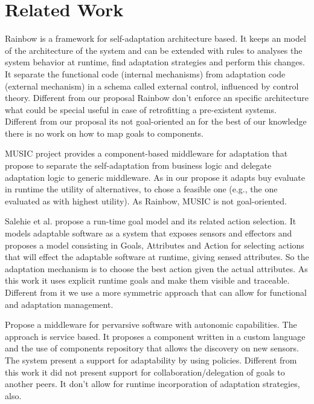 \section{Related Work}
\label{related}


Rainbow is a framework for self-adaptation architecture based\cite{garlan_rainbow:_2004}. It keeps an model of the architecture of the system and can be extended with rules to analyses the system behavior at runtime, find adaptation strategies and perform this changes. It separate the functional  code (internal mechanisms) from adaptation code (external mechanism) in a schema called external control, influenced by control theory. \cite{garlan_software_2009}
Different from our proposal Rainbow don't enforce an specific architecture what could be special useful in case of retrofitting a pre-existent systems. Different from our proposal its not goal-oriented an for the best of our knowledge there is no work on how to map goals to  components.

MUSIC project provides a component-based middleware for adaptation that propose to separate the self-adaptation from business logic and delegate adaptation logic to generic middleware. As in our propose it adapts buy evaluate in runtime the utility of alternatives, to chose a feasible one (e.g., the one evaluated as with highest utility)\cite{rouvoy_music:_2009}. As Rainbow, MUSIC is not goal-oriented.

Salehie et al. \cite{salehie_towards_2012} propose a run-time goal model and its related
action selection. It models adaptable software as a system that exposes sensors and effectors and  proposes a model consisting in Goals, Attributes and Action for selecting actions that will effect the adaptable software at runtime, giving sensed attributes.
So the adaptation mechanism is to choose the best action given the actual attributes.
As this work it uses explicit runtime goals and make them visible and traceable.
Different from it we use a more symmetric approach that can allow for functional
and adaptation management.

\cite{gunalp_autonomic_2012} Propose a middleware for pervarsive software with autonomic capabilities. The approach is service based. It proposes a component written in a custom language and the use of components repository that allows the discovery on new sensors. The system present a support for adaptability by using policies. Different from this work it did not present support for collaboration/delegation of goals to another peers. It don't allow for runtime incorporation of adaptation strategies, also.
